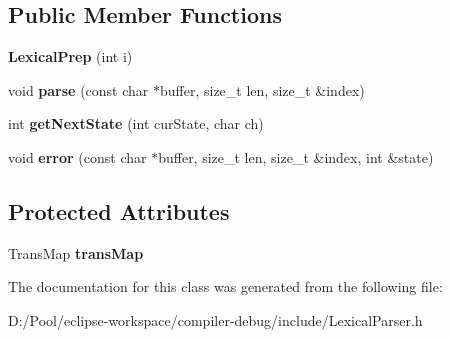 \subsection*{Public Member Functions}
\begin{DoxyCompactItemize}
\item 
\mbox{\label{class_lexical_prep_a43fc5492ea68e6fe3f87acb30859b6f8}} 
{\bfseries Lexical\+Prep} (int i)
\item 
\mbox{\label{class_lexical_prep_aa2f939401b090b47d3b0b7e83fc7dcc5}} 
void {\bfseries parse} (const char $\ast$buffer, size\+\_\+t len, size\+\_\+t \&index)
\item 
\mbox{\label{class_lexical_prep_a06ab3943e6aa2fa865b332d23d580f5c}} 
int {\bfseries get\+Next\+State} (int cur\+State, char ch)
\item 
\mbox{\label{class_lexical_prep_a96c272659246254899a2975671f7a552}} 
void {\bfseries error} (const char $\ast$buffer, size\+\_\+t len, size\+\_\+t \&index, int \&state)
\end{DoxyCompactItemize}
\subsection*{Protected Attributes}
\begin{DoxyCompactItemize}
\item 
\mbox{\label{class_lexical_prep_a33f90741383bd19c6cc4278748be7272}} 
Trans\+Map {\bfseries trans\+Map}
\end{DoxyCompactItemize}


The documentation for this class was generated from the following file\+:\begin{DoxyCompactItemize}
\item 
D\+:/\+Pool/eclipse-\/workspace/compiler-\/debug/include/Lexical\+Parser.\+h\end{DoxyCompactItemize}
